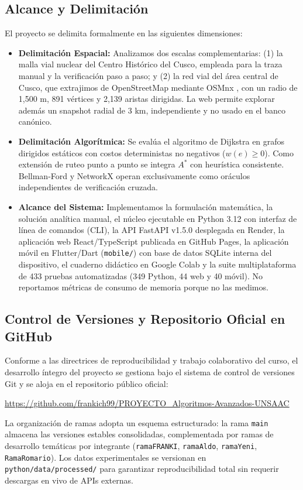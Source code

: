\subsection{Alcance y Delimitación}
El proyecto se delimita formalmente en las siguientes dimensiones:
\begin{itemize}
    \item \textbf{Delimitación Espacial:} Analizamos dos escalas complementarias: (1) la malla vial nuclear del Centro Histórico del Cusco, empleada para la traza manual y la verificación paso a paso; y (2) la red vial del área central de Cusco, que extrajimos de OpenStreetMap mediante OSMnx \parencite{boeing2025osmnx}, con un radio de 1,500 m, 891 vértices y 2,139 aristas dirigidas. La web permite explorar además un snapshot radial de 3 km, independiente y no usado en el banco canónico.
    \item \textbf{Delimitación Algorítmica:} Se evalúa el algoritmo de Dijkstra en grafos dirigidos estáticos con costos deterministas no negativos ($w(e) \ge 0$). Como extensión de ruteo punto a punto se integra $A^*$ con heurística consistente. Bellman-Ford y NetworkX operan exclusivamente como oráculos independientes de verificación cruzada.
    \item \textbf{Alcance del Sistema:} Implementamos la formulación matemática, la solución analítica manual, el núcleo ejecutable en Python 3.12 con interfaz de línea de comandos (CLI), la API FastAPI v1.5.0 desplegada en Render, la aplicación web React/TypeScript publicada en GitHub Pages, la aplicación móvil en Flutter/Dart (\texttt{mobile/}) con base de datos SQLite interna del dispositivo, el cuaderno didáctico en Google Colab y la suite multiplataforma de 433 pruebas automatizadas (349 Python, 44 web y 40 móvil). No reportamos métricas de consumo de memoria porque no las medimos.
\end{itemize}

\subsection{Control de Versiones y Repositorio Oficial en GitHub}
Conforme a las directrices de reproducibilidad y trabajo colaborativo del curso, el desarrollo íntegro del proyecto se gestiona bajo el sistema de control de versiones Git y se aloja en el repositorio público oficial:
\begin{center}
    \url{https://github.com/frankich99/PROYECTO_Algoritmos-Avanzados-UNSAAC}
\end{center}
La organización de ramas adopta un esquema estructurado: la rama \texttt{main} almacena las versiones estables consolidadas, complementada por ramas de desarrollo temáticas por integrante (\texttt{ramaFRANKI}, \texttt{ramaAldo}, \texttt{ramaYeni}, \texttt{RamaRomario}). Los datos experimentales se versionan en \texttt{python/data/processed/} para garantizar reproducibilidad total sin requerir descargas en vivo de APIs externas.


